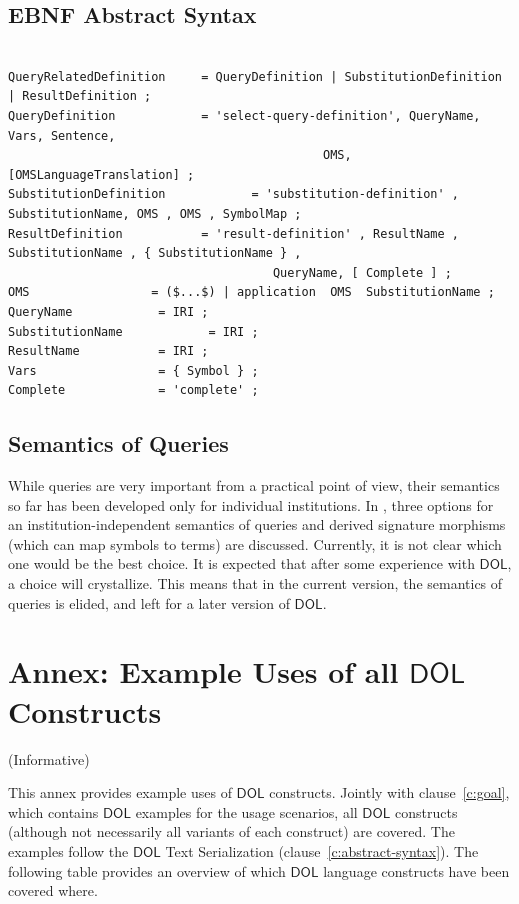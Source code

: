 \documentclass[10pt,fleqn,final]{scrreprt}
\newcommand{\cbs}[0]{\color{red}\xspace} %
\newcommand{\cbe}[0]{\color{black}\xspace} %
\newcommand*{\syntax}[1]{\texttt{#1}}
\newcommand{\semdom}[1]{
\begin{center}
\fbox{$#1$}
\end{center}
}
\newcommand*{\DOL}{\ensuremath{\mathsf{DOL}}\xspace}
\newcommand{\clauserefname}{clause}
\newcommand{\cref}[1]{\clauserefname~\ref{#1}}
\newcommand{\informative}[0]{{\begin{center}{\Large{(Informative})}\end{center}} \bigskip}
\newcommand{\sclause}[1]{\section{#1}}
\newcommand{\infannex}[1]{ \chapter{Annex: #1}  \informative }
\begin{document}
\sclause{EBNF Abstract Syntax}


\begin{lstlisting}[language=ebnf,escapeinside={()},mathescape]  % abstract syntax

QueryRelatedDefinition     = QueryDefinition | SubstitutionDefinition | ResultDefinition ;
QueryDefinition            = 'select-query-definition', QueryName, Vars, Sentence, 
                                            OMS, [OMSLanguageTranslation] ;
SubstitutionDefinition            = 'substitution-definition' , SubstitutionName, OMS , OMS , SymbolMap ;
ResultDefinition           = 'result-definition' , ResultName , SubstitutionName , { SubstitutionName } , 
                                     QueryName, [ Complete ] ;
OMS                 = ($...$) | application  OMS  SubstitutionName ;
QueryName            = IRI ;
SubstitutionName            = IRI ;
ResultName           = IRI ;
Vars                 = { Symbol } ;
Complete             = 'complete' ;
\end{lstlisting}

\sclause{Semantics of Queries}\label{s:sem-queries}

While queries are very important from a practical point of view, their
semantics so far has been developed only for individual institutions.
In \cite{MossakowskiEtAl15a}, three options for an
institution-independent semantics of queries and derived signature
morphisms (which can map symbols to terms) are discussed. Currently,
it is not clear which one would be the best choice. It is expected
that after some experience with \DOL, a choice will crystallize. This
means that in the current version, the semantics of queries is
elided, and left for a later version of \DOL.

%
%
%
%



\infannex{Example Uses of all \DOL Constructs}\label{a:uses}
\cbs
This annex provides example uses of \DOL constructs.  Jointly with
\cref{c:goal}, which  contains \DOL examples for the
usage scenarios, all \DOL constructs (although not necessarily all
variants of each construct) are covered.  The examples follow the \DOL
Text Serialization (\cref{c:abstract-syntax}). The following table
provides an overview of which \DOL language constructs have been 
covered where.
\cbe
\end{document}
